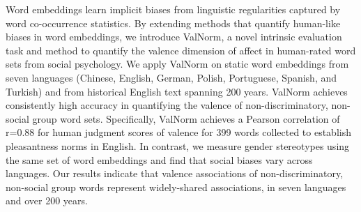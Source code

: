 Word embeddings learn implicit biases from linguistic regularities captured by word co-occurrence statistics. By extending methods that quantify human-like biases in word embeddings, we introduce ValNorm, a novel intrinsic evaluation task and method to quantify the valence dimension of affect in human-rated word sets from social psychology. We apply ValNorm on static word embeddings from seven languages (Chinese, English, German, Polish, Portuguese, Spanish, and Turkish)  and from historical English text spanning 200 years. ValNorm achieves consistently high accuracy in quantifying the valence of non-discriminatory, non-social group word sets. Specifically, ValNorm achieves a Pearson correlation of r=0.88 for human judgment scores of valence for 399 words collected to establish pleasantness norms in English. In contrast, we measure gender stereotypes using the same set of word embeddings and find that social biases vary across languages. Our results indicate that valence associations of non-discriminatory, non-social group words represent widely-shared associations, in seven languages and over 200 years.
